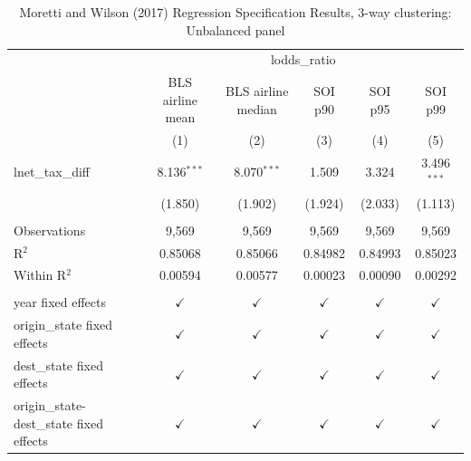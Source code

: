 
\begin{table}[htbp]
   \caption{Moretti and Wilson (2017) Regression Specification Results, 3-way clustering: Unbalanced panel}
   \bigskip
   \centering
   \small
   \begin{tabular}{lccccc}
      \toprule
       & \multicolumn{5}{c}{lodds\_ratio}\\
                                                & BLS airline mean & BLS airline median & SOI p90       & SOI p95       & SOI p99 \\   
                                                & (1)              & (2)                & (3)           & (4)           & (5)\\  
      \midrule 
      lnet\_tax\_diff                           & 8.136$^{***}$    & 8.070$^{***}$      & 1.509         & 3.324         & 3.496$^{***}$\\   
                                                & (1.850)          & (1.902)            & (1.924)       & (2.033)       & (1.113)\\   
       \\
      Observations                              & 9,569            & 9,569              & 9,569         & 9,569         & 9,569\\  
      R$^2$                                     & 0.85068          & 0.85066            & 0.84982       & 0.84993       & 0.85023\\  
      Within R$^2$                              & 0.00594          & 0.00577            & 0.00023       & 0.00090       & 0.00292\\  
       \\
      year fixed effects                        & $\checkmark$     & $\checkmark$       & $\checkmark$  & $\checkmark$  & $\checkmark$\\   
      origin\_state fixed effects               & $\checkmark$     & $\checkmark$       & $\checkmark$  & $\checkmark$  & $\checkmark$\\   
      dest\_state fixed effects                 & $\checkmark$     & $\checkmark$       & $\checkmark$  & $\checkmark$  & $\checkmark$\\   
      origin\_state-dest\_state fixed effects   & $\checkmark$     & $\checkmark$       & $\checkmark$  & $\checkmark$  & $\checkmark$\\   
      \bottomrule
   \end{tabular}
\end{table}


